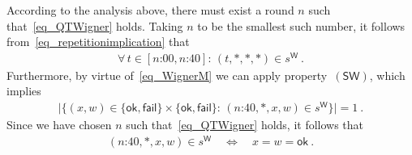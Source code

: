 \documentclass[12pt]{article}
\theoremstyle{plain}
\theoremstyle{definition}
\newcommand*{\Friendone}{\mathsf{F1}}
\newcommand*{\Friendtwo}{\mathsf{F2}}
\newcommand*{\Assistant}{\mathsf{A}}
\newcommand*{\Wigner}{\mathsf{W}}
\newcommand*{\SW}{\mathsf{(SW)}}
\newcommand*{\ok}{\mathsf{ok}}
\newcommand*{\fail}{\mathsf{fail}}
\begin{document}
According to the analysis above, there must exist a round $n$ such that~\eqref{eq_QTWigner} holds. Taking $n$ to be the smallest such number, it follows from~\eqref{eq_repetitionimplication} that
\begin{align} \label{eq_repeatimpl}
  \forall \,  t \in [\text{$n$:00}, \text{$n$:40}] :\,  (t, *, *, *) \in s^{\Wigner}  \ .
\end{align}
Furthermore, by virtue of~\eqref{eq_WignerM} we can apply property~$\SW$, which implies
\begin{align} \label{eq_ywsingle}
    \bigl| \bigl\{(x, w) \in \{\ok, \fail\} \times  \{\ok, \fail\}  : \,  (\text{$n$:40}, *, x, w) \in s^{\Wigner} \bigr\} \bigr| = 1 \ .
\end{align}
Since we have chosen $n$ such that~\eqref{eq_QTWigner} holds, it follows that  
\begin{align} \label{eq_QTWignere}
  (\text{$n$:40}, *, x,  w) \in s^{\Wigner} \quad \iff \quad x = w = \ok \ .
\end{align}
\end{document}
